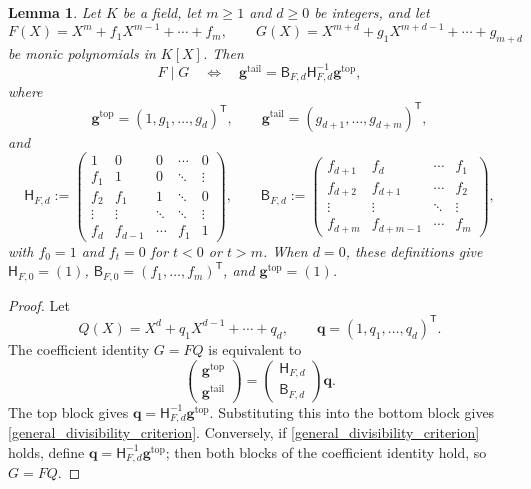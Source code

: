 \documentclass[10pt,a4paper]{amsart}
\newtheorem{lemma}{Lemma}[section]
\begin{document}
\begin{lemma}\label{toeplitzdivision}
Let $K$ be a field, let $m\ge1$ and $d\ge0$ be integers, and let
\[
 F(X)=X^m+f_1X^{m-1}+\cdots+f_m,
 \qquad
 G(X)=X^{m+d}+g_1X^{m+d-1}+\cdots+g_{m+d}
\]
be monic polynomials in $K[X]$.  Then
\begin{equation}\label{general_divisibility_criterion}
 F\mid G
 \quad\Longleftrightarrow\quad
 \mathbf g^{\mathrm{tail}}
 =\mathsf B_{F,d}\mathsf H_{F,d}^{-1}\mathbf g^{\mathrm{top}},
\end{equation}
where
\[
 \mathbf g^{\mathrm{top}}=(1,g_1,\ldots,g_d)^{\mathsf T},
 \qquad
 \mathbf g^{\mathrm{tail}}=(g_{d+1},\ldots,g_{d+m})^{\mathsf T},
\]
and
\[
 \mathsf H_{F,d}:=
 \begin{pmatrix}
  1&0&0&\cdots&0\\
  f_1&1&0&\ddots&\vdots\\
  f_2&f_1&1&\ddots&0\\
  \vdots&\vdots&\ddots&\ddots&\vdots\\
  f_d&f_{d-1}&\cdots&f_1&1
 \end{pmatrix},
 \qquad
 \mathsf B_{F,d}:=
 \begin{pmatrix}
  f_{d+1}&f_d&\cdots&f_1\\
  f_{d+2}&f_{d+1}&\cdots&f_2\\
  \vdots&\vdots&\ddots&\vdots\\
  f_{d+m}&f_{d+m-1}&\cdots&f_m
 \end{pmatrix},
\]
with $f_0=1$ and $f_t=0$ for $t<0$ or $t>m$.
When $d=0$, these definitions give
$\mathsf H_{F,0}=(1)$, $\mathsf B_{F,0}=(f_1,\ldots,f_m)^{\mathsf T}$,
and $\mathbf g^{\mathrm{top}}=(1)$.
\end{lemma}
\begin{proof}
Let
\[
 Q(X)=X^d+q_1X^{d-1}+\cdots+q_d,
 \qquad
 \mathbf q=(1,q_1,\ldots,q_d)^{\mathsf T}.
\]
The coefficient identity $G=FQ$ is equivalent to
\[
 \begin{pmatrix}
  \mathbf g^{\mathrm{top}}\\[1mm]
  \mathbf g^{\mathrm{tail}}
 \end{pmatrix}
 =
 \begin{pmatrix}
  \mathsf H_{F,d}\\[1mm]
  \mathsf B_{F,d}
 \end{pmatrix}
 \mathbf q.
\]
The top block gives
$\mathbf q=\mathsf H_{F,d}^{-1}\mathbf g^{\mathrm{top}}$.
Substituting this into the bottom block gives
\eqref{general_divisibility_criterion}.  Conversely, if
\eqref{general_divisibility_criterion} holds, define
$\mathbf q=\mathsf H_{F,d}^{-1}\mathbf g^{\mathrm{top}}$; then both
blocks of the coefficient identity hold, so $G=FQ$.
\end{proof}
\end{document}
